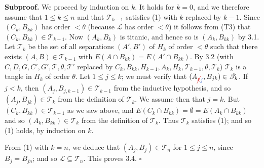 \textbf{Subproof.} We proceed by induction on $k$. It holds for $k = 0$, and we therefore assume that $1 \le k \le n$ and that $\mathscr{T}_{k-1}$ satisfies (1) with $k$ replaced by $k - 1$. Since $(C_k, B_{kk})$ has order $< \theta$ (because $\mathscr{L}$ has order $< \theta$) it follows from (T3) that $(C_k, B_{kk}) \in \mathscr{T}_{k-1}$. Now $(A_k, B_k)$ is titanic, and hence so is $(A_k, B_{kk})$ by 3.1. Let $\mathscr{T}_k$ be the set of all separations $(A', B')$ of $H_k$ of order $< \theta$ such that there exists $(A, B) \in \mathscr{T}_{k-1}$ with $E(A \cap B_{kk}) = E(A' \cap B_{kk})$. By 3.2 (with $C, D, G, C', G', \mathscr{T}, \theta, \mathscr{T}'$ replaced by $C_k, B_{kk}, H_{k-1}, A_k, H_k, \mathscr{T}_{k-1}, \theta, \mathscr{T}_k$) $\mathscr{T}_k$ is a tangle in $H_k$ of order $\theta$. Let $1 \le j \le k$; we must verify that $(A_{\delm{k}\fix{j}}, B_{jk}) \in \mathscr{T}_k$. If $j < k$, then $(A_j, B_{j, k-1}) \in \mathscr{T}_{k-1}$ from the inductive hypothesis, and so $(A_j, B_{jk}) \in \mathscr{T}_k$ from the definition of $\mathscr{T}_k$. We assume then that $j = k$. But $(C_k, B_{kk}) \in \mathscr{T}_{k-1}$ as we saw above, and $E(C_k \cap B_{kk}) = \emptyset = E(A_k \cap B_{kk})$ and so $(A_k, B_{kk}) \in \mathscr{T}_k$ from the definition of $\mathscr{T}_k$. Thus $\mathscr{T}_k$ satisfies (1); and so (1) holds, by induction on $k$.

From (1) with $k = n$, we deduce that $(A_j, B_j) \in \mathscr{T}_n$ for $1 \le j \le n$, since $B_j = B_{jn}$; and so $\mathscr{L} \subseteq \mathscr{T}_n$. This proves 3.4. $\square$
